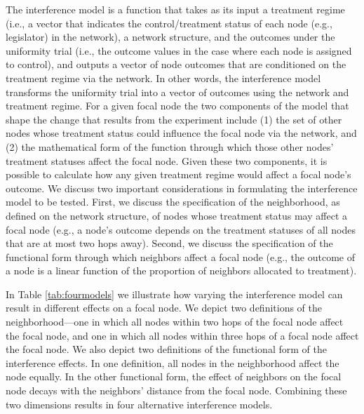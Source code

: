 \documentclass[12pt]{article}
\begin{document}
The interference model is a function that takes as its input a treatment regime (i.e., a vector that indicates the control/treatment status of each node (e.g., legislator) in the network), a network structure, and the outcomes under the uniformity trial (i.e., the outcome values in the case where each node is assigned to control), and outputs a vector of node outcomes that are conditioned on the treatment regime via the network. In other words, the interference model transforms the uniformity trial into a vector of outcomes using the network and treatment regime. For a given focal node the two components of the model that shape the change that results from the experiment include (1) the set of other nodes whose treatment status could influence the focal node via the network, and (2) the mathematical form of the function through which those other nodes' treatment statuses affect the focal node. Given these two components, it is possible to calculate how any given treatment regime would affect a focal node's outcome. We discuss two important considerations in formulating the interference model to be tested. First, we discuss the specification of the neighborhood, as defined on the network structure, of nodes whose treatment status may affect a focal node (e.g., a node's outcome depends on the treatment statuses of all nodes that are at most two hops away). Second, we discuss the specification of the functional form through which neighbors affect a focal node (e.g., the outcome of a node is a linear function of the proportion of neighbors allocated to treatment).

In Table \ref{tab:fourmodels} we illustrate how varying the interference model can result in different effects on a focal node. We depict two definitions of the neighborhood---one in which all nodes within two hops of the focal node affect the focal node, and one in which all nodes within three hops of a focal node affect the focal node. We also depict two definitions of the functional form of the interference effects. In one definition, all nodes in the neighborhood affect the node equally. In the other functional form, the effect of neighbors on the focal node decays with the neighbors' distance from the focal node. Combining these two dimensions results in four alternative interference models.
\end{document}
